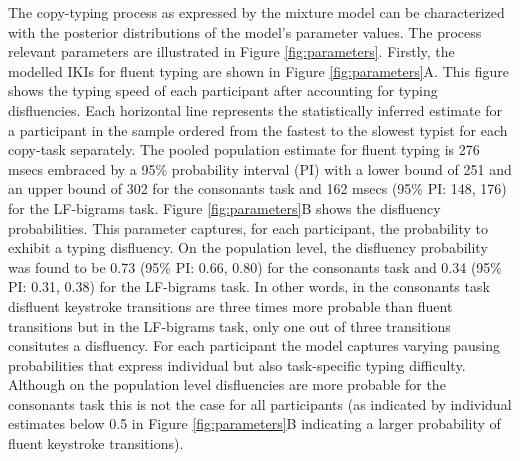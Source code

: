 \documentclass[
  english,
  man,mask,floatsintext]{apa7}
\begin{document}
The copy-typing process as expressed by the mixture model can be characterized with the posterior distributions of the model's parameter values. The process relevant parameters are illustrated in Figure \ref{fig:parameters}. Firstly, the modelled IKIs for fluent typing are shown in Figure \ref{fig:parameters}A. This figure shows the typing speed of each participant after accounting for typing disfluencies. Each horizontal line represents the statistically inferred estimate for a participant in the sample ordered from the fastest to the slowest typist for each copy-task separately. The pooled population estimate for fluent typing is 276 msecs embraced by a 95\% probability interval (PI) with a lower bound of 251 and an upper bound of 302 for the consonants task and 162 msecs (95\% PI: 148, 176) for the LF-bigrams task. Figure \ref{fig:parameters}B shows the disfluency probabilities. This parameter captures, for each participant, the probability to exhibit a typing disfluency. On the population level, the disfluency probability was found to be 0.73 (95\% PI: 0.66, 0.80) for the consonants task and 0.34 (95\% PI: 0.31, 0.38) for the LF-bigrams task. In other words, in the consonants task disfluent keystroke transitions are three times more probable than fluent transitions but in the LF-bigrams task, only one out of three transitions consitutes a disfluency. For each participant the model captures varying pausing probabilities that express individual but also task-specific typing difficulty. Although on the population level disfluencies are more probable for the consonants task this is not the case for all participants (as indicated by individual estimates below 0.5 in Figure \ref{fig:parameters}B indicating a larger probability of fluent keystroke transitions).
\end{document}

